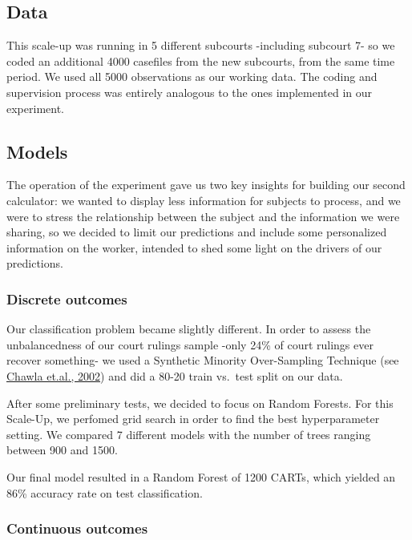 \documentclass[]{article}
\begin{document}
\subsection{Data}\label{data-1}

This scale-up was running in 5 different subcourts -including subcourt
7- so we coded an additional 4000 casefiles from the new subcourts, from the same time period. We used all 5000 observations as our working data.
The coding and supervision process was entirely analogous to the ones
implemented in our experiment.

\subsection{Models}\label{models-1}

The operation of the experiment gave us two key insights for building
our second calculator: we wanted to display less information for
subjects to process, and we were to stress the relationship between the
subject and the information we were sharing, so we decided to limit our
predictions and include some personalized information on the worker,
intended to shed some light on the drivers of our predictions.

\subsubsection{Discrete outcomes}\label{discrete-outcomes-1}

Our classification problem became slightly different. In order to assess
the unbalancedness of our court rulings sample -only 24\% of court
rulings ever recover something- we used a Synthetic Minority
Over-Sampling Technique (see
\href{http://jair.org/media/953/live-953-2037-jair.pdf}{Chawla et.al., 2002}) and did a 80-20 train vs.~test split on our
data.

After some preliminary tests, we decided to focus on Random Forests. For
this Scale-Up, we perfomed grid search in order to find the best
hyperparameter setting. We compared 7 different models with the number
of trees ranging between 900 and 1500.

Our final model resulted in a Random Forest of 1200 CARTs, which yielded
an 86\% accuracy rate on test classification.

\subsubsection{Continuous outcomes}\label{continuous-outcomes-1}
\end{document}
